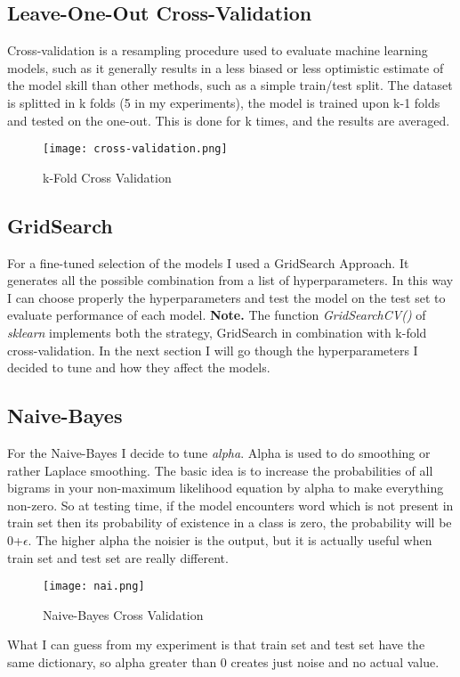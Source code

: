 \documentclass[12pt]{article}
\begin{document}
\subsection{Leave-One-Out Cross-Validation}
Cross-validation is a resampling procedure used to evaluate machine learning models, such as it  generally results in a less biased or less optimistic estimate of the model skill than other methods, such as a simple train/test split.
The dataset is splitted in k folds (5 in my experiments), the model is trained upon k-1 folds and tested on the one-out. This is done for k times, and the results are averaged.
\begin{figure}[h!]
\centering
\texttt{[image: cross-validation.png]}
\caption{k-Fold Cross Validation}
\end{figure}
\subsection{GridSearch}
For a fine-tuned selection of the models I used a GridSearch Approach. It generates all the possible combination from a list of hyperparameters. In this way I can choose properly the hyperparameters and test the model on the test set to evaluate performance of each model. \newline
\textbf{Note.} The function \textit{GridSearchCV()} of \textit{sklearn} implements both the strategy, GridSearch in combination with k-fold cross-validation.
In the next section I will go though the hyperparameters I decided to tune and how they affect the models.
\subsection{Naive-Bayes}
For the Naive-Bayes I decide to tune \textit{alpha}. Alpha is used to do smoothing or rather Laplace smoothing. The basic idea is to increase the probabilities of all bigrams in your non-maximum likelihood equation by alpha to make everything non-zero. So at testing time, if the model encounters word which is not present in train set then its probability of existence in a class is zero, the probability will be 0+$\epsilon$. 
The higher alpha the noisier is the output, but it is actually useful when train set and test set are really different.
\begin{figure}[H]
\centering
\texttt{[image: nai.png]}
\caption{Naive-Bayes Cross Validation}
\end{figure}
What I can guess from my experiment is that train set and test set have the same dictionary, so alpha greater than 0 creates just noise and no actual value.
\end{document}
